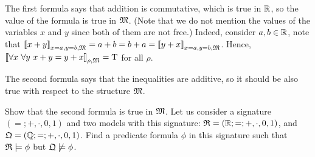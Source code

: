 The first formula says that addition is commutative, which is true in ${\mathbb{R}}$, so
the value of the formula is true in $\mathfrak{M}$. 
(Note that we do not mention the values of the variables $x$ and $y$
since both of them are not free.) Indeed, consider $a, b \in {\mathbb{R}}$, note that
$\left\llbracket {x + y} \right\rrbracket_{x = a, y = b, \mathfrak{M}} = a + b = b + a = 
  \left\llbracket {y + x} \right\rrbracket_{x = a, y = b, \mathfrak{M}}$. Hence, 
$\left\llbracket {\forall x \ \forall y \ x + y = y + x} \right\rrbracket_{\rho, \mathfrak{M}} = \text{T}$
for all $\rho$.

The second formula says that the inequalities are additive, so it should be also
true with respect to the structure $\mathfrak{M}$.

\begin{chapterendexercises}
  \exercise
    Show that the second formula is true in $\mathfrak{M}$.
  \exercise
    Let us consider a signature $(=; +, \cdot, 0, 1)$ and two models with this
    signature: $\mathfrak{R} = ({\mathbb{R}}; =; +, \cdot, 0, 1)$, and
    $\mathfrak{Q} = ({\mathbb{Q}}; =; +, \cdot, 0, 1)$.
    Find a predicate formula $\phi$ in this signature such that
    $\mathfrak{R} \models \phi$ but $\mathfrak{Q} \not\models \phi$.
\end{chapterendexercises}

